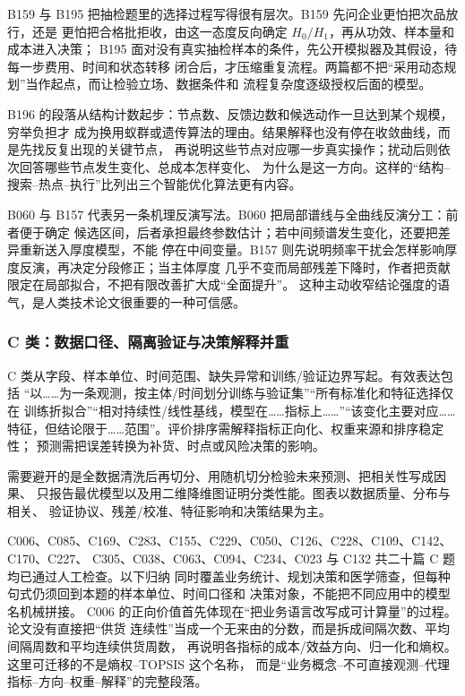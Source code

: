 \documentclass[UTF8,a4paper,12pt]{ctexart}
\begin{document}
B159 与 B195 把抽检题里的选择过程写得很有层次。B159 先问企业更怕把次品放行，还是
更怕把合格批拒收，由这一态度反向确定 $H_0/H_1$，再从功效、样本量和成本进入决策；
B195 面对没有真实抽检样本的条件，先公开模拟器及其假设，待每一步费用、时间和状态转移
闭合后，才压缩重复流程。两篇都不把“采用动态规划”当作起点，而让检验立场、数据条件和
流程复杂度逐级授权后面的模型。

B196 的段落从结构计数起步：节点数、反馈边数和候选动作一旦达到某个规模，穷举负担才
成为换用蚁群或遗传算法的理由。结果解释也没有停在收敛曲线，而是先找反复出现的关键节点，
再说明这些节点对应哪一步真实操作；扰动后则依次回答哪些节点发生变化、总成本怎样变化、
为什么是这一方向。这样的“结构--搜索--热点--执行”比列出三个智能优化算法更有内容。

B060 与 B157 代表另一条机理反演写法。B060 把局部谱线与全曲线反演分工：前者便于确定
候选区间，后者承担最终参数估计；若中间频谱发生变化，还要把差异重新送入厚度模型，不能
停在中间变量。B157 则先说明频率干扰会怎样影响厚度反演，再决定分段修正；当主体厚度
几乎不变而局部残差下降时，作者把贡献限定在局部拟合，不把有限改善扩大成“全面提升”。
这种主动收窄结论强度的语气，是人类技术论文很重要的一种可信感。

\subsubsection{C 类：数据口径、隔离验证与决策解释并重}

C 类从字段、样本单位、时间范围、缺失异常和训练/验证边界写起。有效表达包括
“以……为一条观测，按主体/时间划分训练与验证集”“所有标准化和特征选择仅在
训练折拟合”“相对持续性/线性基线，模型在……指标上……”“该变化主要对应……
特征，但结论限于……范围”。评价排序需解释指标正向化、权重来源和排序稳定性；
预测需把误差转换为补货、时点或风险决策的影响。

需要避开的是全数据清洗后再切分、用随机切分检验未来预测、把相关性写成因果、
只报告最优模型以及用二维降维图证明分类性能。图表以数据质量、分布与相关、
验证协议、残差/校准、特征影响和决策结果为主。

C006、C085、C169、C283、C155、C229、C050、C126、C228、C109、C142、C170、C227、
C305、C038、C063、C094、C234、C023 与 C132 共二十篇 C 题均已通过人工检查。以下归纳
同时覆盖业务统计、规划决策和医学筛查，但每种句式仍须回到本题的样本单位、时间口径和
决策对象，不能把不同应用中的模型名机械拼接。
C006 的正向价值首先体现在“把业务语言改写成可计算量”的过程。论文没有直接把“供货
连续性”当成一个无来由的分数，而是拆成间隔次数、平均间隔周数和平均连续供货周数，
再说明各指标的成本/效益方向、归一化和熵权。这里可迁移的不是熵权--TOPSIS 这个名称，
而是“业务概念--不可直接观测--代理指标--方向--权重--解释”的完整段落。
\end{document}
